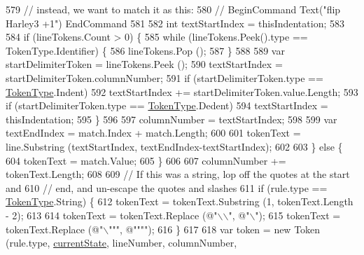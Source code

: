 \begin{DoxyCode}
579                         \textcolor{comment}{// instead, we want to match it as this:}
580                         \textcolor{comment}{//    BeginCommand Text("flip Harley3 +1") EndCommand}
581 
582                         \textcolor{keywordtype}{int} textStartIndex = thisIndentation;
583 
584                         \textcolor{keywordflow}{if} (lineTokens.Count > 0) \{
585                             \textcolor{keywordflow}{while} (lineTokens.Peek().type == TokenType.Identifier) \{
586                                 lineTokens.Pop ();
587                             \}
588 
589                             var startDelimiterToken = lineTokens.Peek ();
590                             textStartIndex = startDelimiterToken.columnNumber;
591                             \textcolor{keywordflow}{if} (startDelimiterToken.type == \hyperlink{a00029_a301aa7c866593a5b625a8fc158bbeace}{TokenType}.Indent)
592                                 textStartIndex += startDelimiterToken.value.Length;
593                             \textcolor{keywordflow}{if} (startDelimiterToken.type == \hyperlink{a00029_a301aa7c866593a5b625a8fc158bbeace}{TokenType}.Dedent)
594                                 textStartIndex = thisIndentation;
595                         \}
596 
597                         columnNumber = textStartIndex;
598 
599                         var textEndIndex = match.Index + match.Length;
600 
601                         tokenText = line.Substring (textStartIndex, textEndIndex-textStartIndex);
602 
603                     \} \textcolor{keywordflow}{else} \{
604                         tokenText = match.Value;
605                     \}
606 
607                     columnNumber += tokenText.Length;
608 
609                     \textcolor{comment}{// If this was a string, lop off the quotes at the start and}
610                     \textcolor{comment}{// end, and un-escape the quotes and slashes}
611                     \textcolor{keywordflow}{if} (rule.type == \hyperlink{a00029_a301aa7c866593a5b625a8fc158bbeace}{TokenType}.String) \{
612                         tokenText = tokenText.Substring (1, tokenText.Length - 2);
613 
614                         tokenText = tokenText.Replace (\textcolor{stringliteral}{@"\(\backslash\)\(\backslash\)"}, \textcolor{stringliteral}{@"\(\backslash\)"});
615                         tokenText = tokenText.Replace (\textcolor{stringliteral}{@"\(\backslash\)"""}, \textcolor{stringliteral}{@""""});
616                     \}
617 
618                     var token = \textcolor{keyword}{new} Token (rule.type, \hyperlink{a00099_ac90b7dce8103425a148f9e8588f14137}{currentState}, lineNumber, columnNumber, 

\end{DoxyCode}
